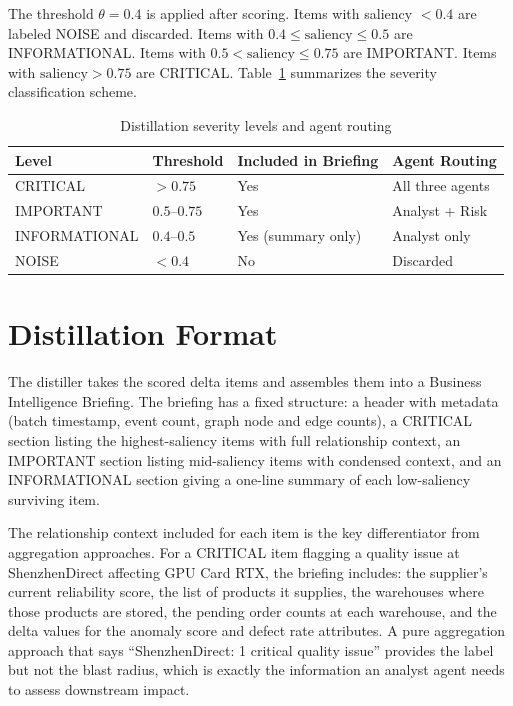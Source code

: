 The threshold $\theta = 0.4$ is applied after scoring. Items with saliency $< 0.4$
are labeled NOISE and discarded. Items with $0.4 \leq \text{saliency} \leq 0.5$ are
INFORMATIONAL. Items with $0.5 < \text{saliency} \leq 0.75$ are IMPORTANT. Items with
$\text{saliency} > 0.75$ are CRITICAL. Table~\ref{tab:severity_levels} summarizes
the severity classification scheme.

\begin{table}[H]
\centering
\caption{Distillation severity levels and agent routing}
\label{tab:severity_levels}
\begin{tabular}{llll}
\toprule
\textbf{Level} & \textbf{Threshold} & \textbf{Included in Briefing} & \textbf{Agent Routing} \\
\midrule
CRITICAL      & $> 0.75$       & Yes & All three agents \\
IMPORTANT     & $0.5$--$0.75$  & Yes & Analyst + Risk \\
INFORMATIONAL & $0.4$--$0.5$   & Yes (summary only) & Analyst only \\
NOISE         & $< 0.4$        & No  & Discarded \\
\bottomrule
\end{tabular}
\end{table}

\section{Distillation Format}
\label{sec:distillation_format}

The distiller takes the scored delta items and assembles them into a Business Intelligence
Briefing. The briefing has a fixed structure: a header with metadata (batch timestamp,
event count, graph node and edge counts), a CRITICAL section listing the highest-saliency
items with full relationship context, an IMPORTANT section listing mid-saliency items
with condensed context, and an INFORMATIONAL section giving a one-line summary of each
low-saliency surviving item.

The relationship context included for each item is the key differentiator from aggregation
approaches. For a CRITICAL item flagging a quality issue at ShenzhenDirect affecting
GPU Card RTX, the briefing includes: the supplier's current reliability score, the list
of products it supplies, the warehouses where those products are stored, the pending
order counts at each warehouse, and the delta values for the anomaly score and defect
rate attributes. A pure aggregation approach that says ``ShenzhenDirect: 1 critical quality
issue'' provides the label but not the blast radius, which is exactly the information an
analyst agent needs to assess downstream impact.

